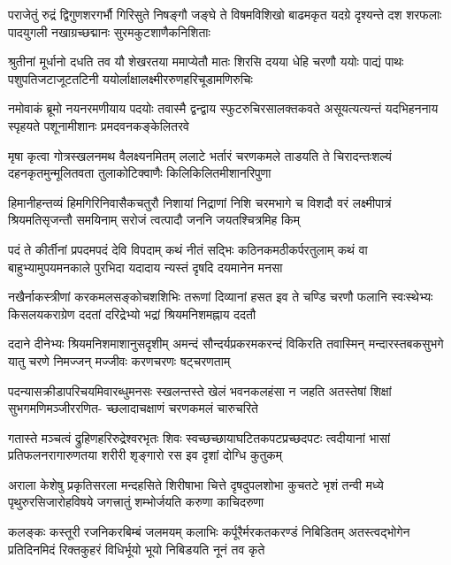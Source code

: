 \fourlineindentedshloka
{पराजेतुं रुद्रं द्विगुणशरगर्भौ गिरिसुते}
{निषङ्गौ जङ्घे ते विषमविशिखो बाढमकृत}
{यदग्रे दृश्यन्ते दश शरफलाः पादयुगली}
{नखाग्रच्छद्मानः सुरमकुटशाणैकनिशिताः}%

\fourlineindentedshloka
{श्रुतीनां मूर्धानो दधति तव यौ शेखरतया}
{ममाप्येतौ मातः शिरसि दयया धेहि चरणौ}
{ययोः पाद्यं पाथः पशुपतिजटाजूटतटिनी}
{ययोर्लाक्षालक्ष्मीररुणहरिचूडामणिरुचिः}%

\fourlineindentedshloka
{नमोवाकं ब्रूमो नयनरमणीयाय पदयोः}
{तवास्मै द्वन्द्वाय स्फुटरुचिरसालक्तकवते}
{असूयत्यत्यन्तं यदभिहननाय स्पृहयते}
{पशूनामीशानः प्रमदवनकङ्केलितरवे}%

\fourlineindentedshloka
{मृषा कृत्वा गोत्रस्खलनमथ वैलक्ष्यनमितम्}
{ललाटे भर्तारं चरणकमले ताडयति ते}
{चिरादन्तःशल्यं दहनकृतमुन्मूलितवता}
{तुलाकोटिक्वाणैः किलिकिलितमीशानरिपुणा}%

\fourlineindentedshloka
{हिमानीहन्तव्यं हिमगिरिनिवासैकचतुरौ}
{निशायां निद्राणां निशि चरमभागे च विशदौ}
{वरं लक्ष्मीपात्रं श्रियमतिसृजन्तौ समयिनाम्}
{सरोजं त्वत्पादौ जननि जयतश्चित्रमिह किम्}%

\fourlineindentedshloka
{पदं ते कीर्तीनां प्रपदमपदं देवि विपदाम्}
{कथं नीतं सद्भिः कठिनकमठीकर्परतुलाम्}
{कथं वा बाहुभ्यामुपयमनकाले पुरभिदा}
{यदादाय न्यस्तं दृषदि दयमानेन मनसा}%

\fourlineindentedshloka
{नखैर्नाकस्त्रीणां करकमलसङ्कोचशशिभिः}
{तरूणां दिव्यानां हसत इव ते चण्डि चरणौ}
{फलानि स्वःस्थेभ्यः किसलयकराग्रेण ददतां}
{दरिद्रेभ्यो भद्रां श्रियमनिशमह्नाय ददतौ}%

\fourlineindentedshloka
{ददाने दीनेभ्यः श्रियमनिशमाशानुसदृशीम्}
{अमन्दं सौन्दर्यप्रकरमकरन्दं विकिरति}
{तवास्मिन् मन्दारस्तबकसुभगे यातु चरणे}
{निमज्जन् मज्जीवः करणचरणः षट्चरणताम्}%

\fourlineindentedshloka
{पदन्यासक्रीडापरिचयमिवारब्धुमनसः}
{स्खलन्तस्ते खेलं भवनकलहंसा न जहति}
{अतस्तेषां शिक्षां सुभगमणिमञ्जीररणित-}
{च्छलादाचक्षाणं चरणकमलं चारुचरिते}%

\fourlineindentedshloka
{गतास्ते मञ्चत्वं द्रुहिणहरिरुद्रेश्वरभृतः}
{शिवः स्वच्छच्छायाघटितकपटप्रच्छदपटः}
{त्वदीयानां भासां प्रतिफलनरागारुणतया}
{शरीरी शृङ्गारो रस इव दृशां दोग्धि कुतुकम्}%

\fourlineindentedshloka
{अराला केशेषु प्रकृतिसरला मन्दहसिते}
{शिरीषाभा चित्ते दृषदुपलशोभा कुचतटे}
{भृशं तन्वी मध्ये पृथुरुरसिजारोहविषये}
{जगत्त्रातुं शम्भोर्जयति करुणा काचिदरुणा}%

\fourlineindentedshloka
{कलङ्कः कस्तूरी रजनिकरबिम्बं जलमयम्}
{कलाभिः कर्पूरैर्मरकतकरण्डं निबिडितम्}
{अतस्त्वद्भोगेन प्रतिदिनमिदं रिक्तकुहरं}
{विधिर्भूयो भूयो निबिडयति नूनं तव कृते}%

